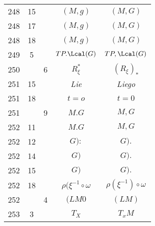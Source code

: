 \documentclass[a4paper,11pt]{article}
\numberwithin{equation}{section}
\begin{document}
\begin{center}
\begin{tabular}{|c|c|c|c|c|}
    248 & 15 & & $( M, g )$ & $( M, G )$ \\
    248 & 17 & & $( M, g )$ & $( M, G )$ \\
    248 & 18 & & $( M, g )$ & $( M, G )$ \\
    249 & \hphantom{0}5 & & $TP.\Lcal( G )$ & $TP, \Lcal( G )$ \\
    250 & & \hphantom{0}6 & $R_{ \xi }^{ * }$ & $( R_{ \xi } )_{ * }$ \\
    251 & 15 & & \textit{Lie} & \textit{Liego} \\
    251 & 18 & & $t = o$ & $t = 0$ \\
    251 & & \hphantom{0}9 & $M.G$ & $M, G$ \\
    252 & 11 & & $M.G$ & $M, G$ \\
    252 & 12 & & $G):$ & $G).$ \\
    252 & 14 & & $G)$ & $G).$ \\
    252 & 15 & & $G)$ & $G).$ \\
    252 & 18 & & $\rho( \xi^{ -1 } \circ \omega$
           & $\rho( \xi^{ -1 } ) \circ \omega$ \\
    252 & & \hphantom{0}4 & $( LM 0$ & $( LM )$ \\
    253 & \hphantom{0}3 & & $T_{ X }$ & $T_{ x }M$ \\
    \hline
  \end{tabular}





  \newpage


\end{center}
\end{document}
